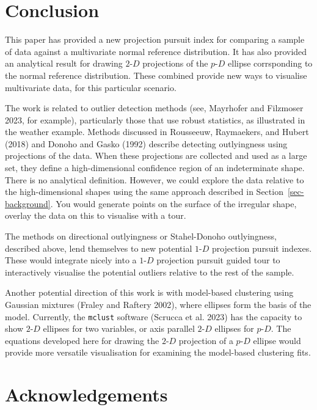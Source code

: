 \documentclass[
  12pt,
]{interact}
\newcommand\pD{$p\text{-}D$}
\newcommand\gD{$2\text{-}D$}
\newcommand\bD{$1\text{-}D$}
\begin{document}
\section{Conclusion}\label{conclusion}

This paper has provided a new projection pursuit index for comparing a
sample of data against a multivariate normal reference distribution. It
has also provided an analytical result for drawing \gD{} projections of
the \pD{} ellipse corrsponding to the normal reference distribution.
These combined provide new ways to visualise multivariate data, for this
particular scenario.

The work is related to outlier detection methods (see, Mayrhofer and
Filzmoser 2023, for example), particularly those that use robust
statistics, as illustrated in the weather example. Methods discussed in
Rousseeuw, Raymaekers, and Hubert (2018) and Donoho and Gasko (1992)
describe detecting outlyingness using projections of the data. When
these projections are collected and used as a large set, they define a
high-dimensional confidence region of an indeterminate shape. There is
no analytical definition. However, we could explore the data relative to
the high-dimensional shapes using the same approach described in
Section~\ref{sec-background}. You would generate points on the surface
of the irregular shape, overlay the data on this to visualise with a
tour.

The methods on directional outlyingness or Stahel-Donoho outlyingness,
described above, lend themselves to new potential \bD{} projection
pursuit indexes. These would integrate nicely into a \bD{} projection
pursuit guided tour to interactively visualise the potential outliers
relative to the rest of the sample.

Another potential direction of this work is with model-based clustering
using Gaussian mixtures (Fraley and Raftery 2002), where ellipses form
the basis of the model. Currently, the \texttt{mclust} software (Scrucca
et al. 2023) has the capacity to show \gD{} ellipses for two variables,
or axis parallel \gD{} ellipses for \pD{}. The equations developed here
for drawing the \gD{} projection of a \pD{} ellipse would provide more
versatile visualisation for examining the model-based clustering fits.

\section*{Acknowledgements}\label{acknowledgements}
\end{document}
